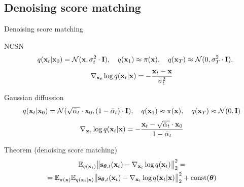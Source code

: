 \subsection{Denoising score matching}
\begin{frame}{Denoising score matching}
	\begin{block}{NCSN} 
		\vspace{-0.5cm} 
		\[
			\quad q(\mathbf{x}_t | \mathbf{x}_0) = \mathcal{N}(\mathbf{x}, \sigma_t^2 \cdot \mathbf{I}), \quad q(\mathbf{x}_1) \approx \pi(\mathbf{x}), \quad q(\mathbf{x}_T) \approx \mathcal{N}(0, \sigma_T^2 \cdot \mathbf{I}).
		\]
		\[
			\nabla_{\mathbf{x}_t} \log q(\mathbf{x}_t | \mathbf{x}) = - \frac{\mathbf{x}_t - \mathbf{x}}{\sigma_t^2}
		\]
		\vspace{-0.5cm} 
	\end{block}
	\begin{block}{Gaussian diffussion}
		\vspace{-0.5cm} 
		\[
			q(\mathbf{x}_t | \mathbf{x}_0) = \mathcal{N}(\sqrt{\bar{\alpha}_t} \cdot \mathbf{x}_0, (1 - \bar{\alpha}_t) \cdot \mathbf{I}), \quad q(\mathbf{x}_1) \approx \pi(\mathbf{x}), \quad q(\mathbf{x}_T) \approx \mathcal{N}(0, \mathbf{I})
		\]
		\[
			\nabla_{\mathbf{x}_t} \log q(\mathbf{x}_t | \mathbf{x}) = - \frac{\mathbf{x}_t - \sqrt{\bar{\alpha}_t} \cdot \mathbf{x}_0}{1 - \bar{\alpha}_t}
		\]
		\vspace{-0.5cm} 
	\end{block}
	\begin{block}{Theorem (denoising score matching)}
	\vspace{-0.7cm}
	\begin{multline*}
		\mathbb{E}_{q(\mathbf{x}_t)}\bigl\| \mathbf{s}_{\boldsymbol{\theta}, t}(\mathbf{x}_t) - \nabla_{\mathbf{x}_t} \log q(\mathbf{x}_t) \bigr\|^2_2 = \\
		= \mathbb{E}_{\pi(\mathbf{x})} \mathbb{E}_{q(\mathbf{x}_t | \mathbf{x})}\bigl\| \mathbf{s}_{\boldsymbol{\theta}, t}(\mathbf{x}_t) - \nabla_{\mathbf{x}_t} \log q(\mathbf{x}_t | \mathbf{x}) \bigr\|^2_2 + \text{const}(\boldsymbol{\theta})
	\end{multline*}
	\vspace{-0.5cm}
	\end{block}
\end{frame}
